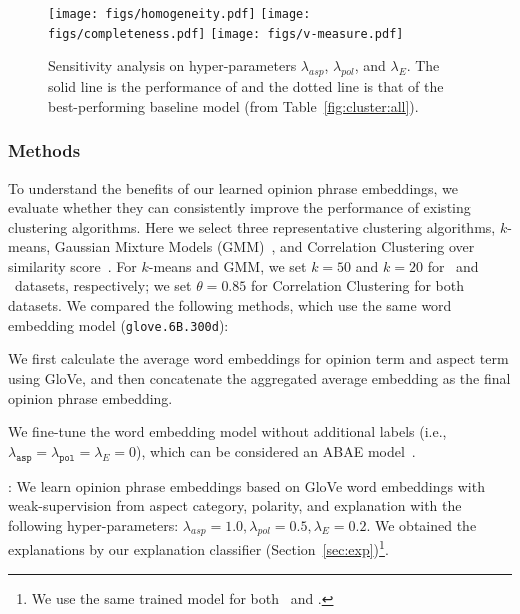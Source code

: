 \begin{figure*}[th!]
  \texttt{[image: figs/homogeneity.pdf]}
\endminipage\hfill
{}
  \texttt{[image: figs/completeness.pdf]}
\endminipage\hfill
{}%
  \texttt{[image: figs/v-measure.pdf]}
\endminipage\hfill
\endminipage
\caption{Sensitivity analysis on hyper-parameters $\lambda_{asp}$, $\lambda_{pol}$, and $\lambda_{E}$. The solid line is the performance of \canonical{} and the dotted line is that of the best-performing baseline model (from Table~\ref{fig:cluster:all}).}\label{fig:sensitivity}
\vspace{-4mm}
\end{figure*}

\subsubsection{Methods}
To understand the benefits of our learned opinion phrase embeddings, we evaluate whether they can consistently improve the performance of existing clustering algorithms. Here we select three representative clustering algorithms, $k$-means, Gaussian Mixture Models (GMM)~\cite{Bishop:2006:PRML}, and Correlation Clustering over similarity score~\cite{Bansal:2004:CorrelationClustering,Elsner-schudy-2009-bounding:CorrelationClustering}. For $k$-means and GMM, we set $k=50$ and $k=20$ for \hotel\ and \restaurant\ datasets, respectively; we set $\theta=0.85$ for Correlation Clustering for both datasets. We compared the following methods, which use the same word embedding model ({\tt glove.6B.300d}):

\noindent {\bf \glove:} 
We first calculate the average word embeddings for opinion term and aspect term using GloVe, and then concatenate the aggregated average embedding as the final opinion phrase embedding.

 We fine-tune the word embedding model without additional labels (i.e., $\lambda_\mathtt{asp}=\lambda_\mathtt{pol}=\lambda_E=0$), which can be considered an ABAE model~\cite{he2017unsupervised}.


\noindent {\bf \canonical}: We learn opinion phrase embeddings based on GloVe word embeddings with weak-supervision from aspect category, polarity, and explanation with the following hyper-parameters: $\lambda_{asp}=1.0, \lambda_{pol}=0.5, \lambda_{E}=0.2$. We obtained the explanations by our explanation classifier (Section~\ref{sec:exp})\footnote{We use the same trained model for both \hotel\ and \restaurant.}.


